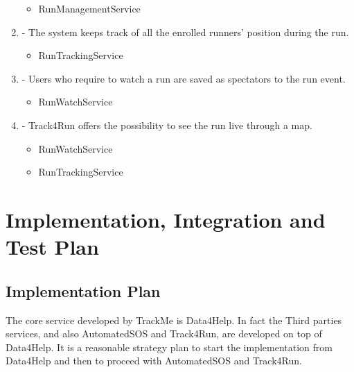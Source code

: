 \documentclass[a4paper]{article}
\begin{document}
\begin{enumerate}[label*=\bf{R.\arabic*}]
\begin{itemize}
\item RunManagementService
\end{itemize}

\item - The system keeps track of all the enrolled runners’ position during the run.

\begin{itemize}
\item RunTrackingService
\end{itemize}

\item - Users who require to watch a run are saved as spectators to the run event.

\begin{itemize}
\item RunWatchService
\end{itemize}

\item - Track4Run offers the possibility to see the run live through a map.

\begin{itemize}
\item RunWatchService
\item RunTrackingService
\end{itemize}

\end{enumerate}

\section{Implementation, Integration and Test Plan}

\subsection{Implementation Plan}
The core service developed by TrackMe is Data4Help. In fact the Third parties services, and also AutomatedSOS and Track4Run, are developed on top of Data4Help. 
It is a reasonable strategy plan to start the implementation from Data4Help and then to proceed with AutomatedSOS and Track4Run.
\end{document}
